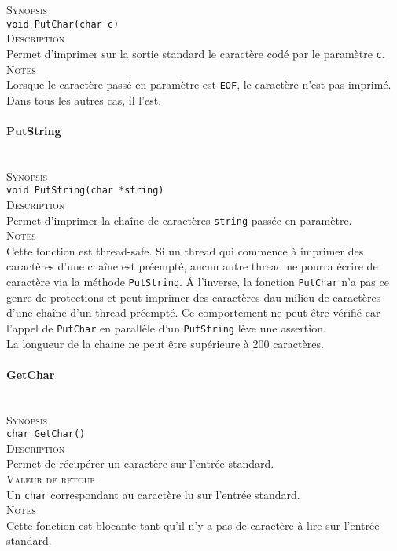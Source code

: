 \documentclass{report}
\newcommand{\myparagraph}[1]{\paragraph*{#1}\mbox{}\\}
\begin{document}
\textsc{Synopsis}\\
	\texttt{void PutChar(char c)}\\
	
\textsc{Description}\\
	Permet d'imprimer sur la sortie standard le caractère codé par le paramètre \texttt{c}.\\
	
\textsc{Notes}\\
	Lorsque le caractère passé en paramètre est \texttt{EOF}, le caractère n'est pas imprimé. Dans tous les autres cas, il l'est.




\myparagraph{PutString}

\textsc{Synopsis}\\
	\texttt{void PutString(char *string)}\\
	
\textsc{Description}\\
	Permet d'imprimer la chaîne de caractères \texttt{string} passée en paramètre.\\
	
\textsc{Notes}\\
	Cette fonction est thread-safe. Si un thread qui commence à imprimer des caractères d'une chaîne est préempté, aucun autre thread ne pourra écrire de caractère via la méthode \texttt{PutString}. À l'inverse, la fonction \texttt{PutChar} n'a pas ce genre de protections et peut imprimer des caractères dau milieu de caractères d'une chaîne d'un thread préempté. Ce comportement ne peut être vérifié car l'appel de \texttt{PutChar} en parallèle d'un \texttt{PutString} lève une assertion.\\
	La longueur de la chaine ne peut être supérieure à 200 caractères.


\myparagraph{GetChar}

\textsc{Synopsis}\\
	\texttt{char GetChar()}\\
	
\textsc{Description}\\
	Permet de récupérer un caractère sur l'entrée standard.\\
	
\textsc{Valeur de retour}\\
	Un \texttt{char} correspondant au caractère lu sur l'entrée standard.\\
	
\textsc{Notes}\\
	Cette fonction est blocante tant qu'il n'y a pas de caractère à lire sur l'entrée standard.
	
\end{document}
